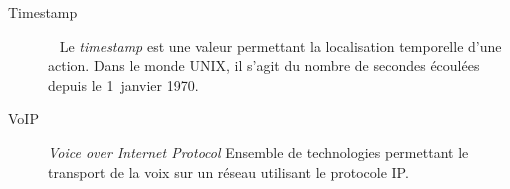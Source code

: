\begin{description}
	\item[Timestamp] ~ \newline Le \textit{timestamp} est une valeur permettant la localisation temporelle d’une action. Dans le monde UNIX, il s’agit du nombre de secondes écoulées depuis le 1\ier~janvier 1970.
		
	\item[VoIP] \textit{Voice over Internet Protocol} \newline Ensemble de technologies permettant le transport de la voix sur un réseau utilisant le protocole IP.
\end{description}
